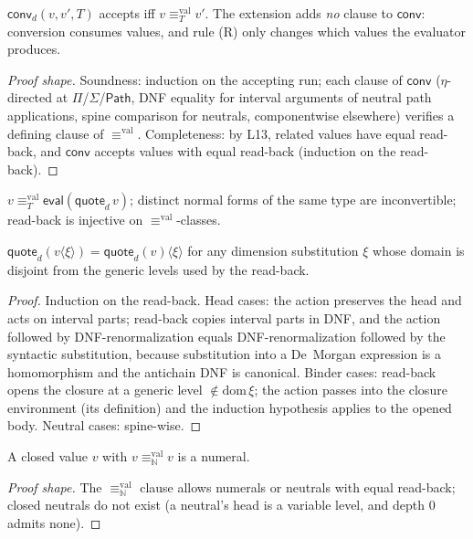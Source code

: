 \documentclass{lmcs}
\newcommand{\valeq}{\equiv^{\mathrm{val}}}
\newcommand{\Path}{\mathsf{Path}}
\newcommand{\evalop}{\mathsf{eval}}
\newcommand{\convop}{\mathsf{conv}}
\newcommand{\quo}{\mathsf{quote}}
\begin{document}
\begin{lem}\label{lem:L12}
  $\convop_d(v, v', T)$ accepts iff $v \valeq_T v'$.  The extension
  adds \emph{no} clause to $\convop$: conversion consumes values,
  and rule (R) only changes which values the evaluator produces.
\end{lem}
\begin{proof}[Proof shape]
  Soundness: induction on the accepting run; each clause of
  $\convop$ ($\eta$-directed at $\Pi$/$\Sigma$/$\Path$, DNF equality
  for interval arguments of neutral path applications, spine
  comparison for neutrals, componentwise elsewhere) verifies a
  defining clause of $\valeq$.  Completeness: by L13, related values
  have equal read-back, and $\convop$ accepts values with equal
  read-back (induction on the read-back).
\end{proof}

\begin{lem}\label{lem:L13}
  $v \valeq_T \evalop(\quo_d\,v)$; distinct normal forms of the same
  type are inconvertible; read-back is injective on
  $\valeq$-classes.
\end{lem}

\begin{lem}\label{lem:L14}
  $\quo_d(v\langle\xi\rangle) = \quo_d(v)\langle\xi\rangle$ for any
  dimension substitution $\xi$ whose domain is disjoint from the
  generic levels used by the read-back.
\end{lem}
\begin{proof}
  Induction on the read-back.  Head cases: the action preserves the
  head and acts on interval parts; read-back copies interval parts in
  DNF, and the action followed by DNF-renormalization equals
  DNF-renormalization followed by the syntactic substitution, because
  substitution into a De~Morgan expression is a homomorphism and the
  antichain DNF is canonical.  Binder cases: read-back opens the
  closure at a generic level $\notin \mathrm{dom}\,\xi$; the action
  passes into the closure environment (its definition) and the
  induction hypothesis applies to the opened body.  Neutral cases:
  spine-wise.
\end{proof}

\begin{lem}\label{lem:L15}
  A closed value $v$ with $v \valeq_{\mathbb{N}} v$ is a numeral.
\end{lem}
\begin{proof}[Proof shape]
  The $\valeq_{\mathbb{N}}$ clause allows numerals or neutrals with
  equal read-back; closed neutrals do not exist (a neutral's head is
  a variable level, and depth $0$ admits none).
\end{proof}
\end{document}
